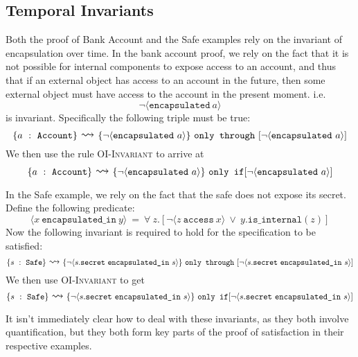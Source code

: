 \documentclass[12pt]{article}
\newcommand\trans[1]{\overset{#1}{\mathlarger{\mathlarger \leadsto}}}
\newcommand\onlyIf[3]{\{#1\}\ \trans{}\ \{#2\}\ \texttt{only if} [#3]}
\newcommand\onlyThrough[3]{\{#1\}\ \trans{}\ \{#2\}\ \texttt{only through}\ [#3]}
\begin{document}
\subsection{Temporal Invariants}
Both the proof of Bank Account and the Safe examples rely on the invariant of encapsulation over time.
In the bank account proof, we rely on the fact that it is not possible for internal components to 
expose access to an account, and thus that if an external object has access to an account in the future, then 
some external object must have access to the account in the present moment. 
i.e.
$$\neg\langle \texttt{encapsulated}\ a  \rangle$$
is invariant. Specifically the following triple must be true:
$$\onlyThrough{a\ :\ \texttt{Account}}{\neg\langle \texttt{encapsulated}\ a  \rangle}{\neg\langle \texttt{encapsulated}\ a  \rangle}$$
We then use the rule \textsc{OI-Invariant} to arrive at 
$$\onlyIf{a\ :\ \texttt{Account}}{\neg\langle \texttt{encapsulated}\ a  \rangle}{\neg\langle \texttt{encapsulated}\ a  \rangle}$$

In the Safe example, we rely on the fact that the safe does not expose
its secret. Define the following predicate:
$$\langle x\ \texttt{encapsulated\_in}\ y\rangle\ =\ \forall\ z.[\neg \langle z\ \texttt{access}\ x \rangle\ \vee\ y.\texttt{is\_internal}(z)]$$
Now the following invariant is required to hold for the specification to be satisfied:
\small
$$\onlyThrough{s\ :\ \texttt{Safe}}{\neg\langle s.\texttt{secret}\ \texttt{encapsulated\_in}\ s  \rangle}{\neg\langle s.\texttt{secret}\ \texttt{encapsulated\_in}\ s  \rangle}$$
\normalsize
We then use \textsc{OI-Invariant} to get
\small
$$\onlyIf{s\ :\ \texttt{Safe}}{\neg\langle s.\texttt{secret}\ \texttt{encapsulated\_in}\ s  \rangle}{\neg\langle s.\texttt{secret}\ \texttt{encapsulated\_in}\ s  \rangle}$$
\normalsize

It isn't immediately clear how to deal with these invariants, as they both involve quantification, but they both form key parts of the proof 
of satisfaction in their respective examples.




	
	
\end{document}
